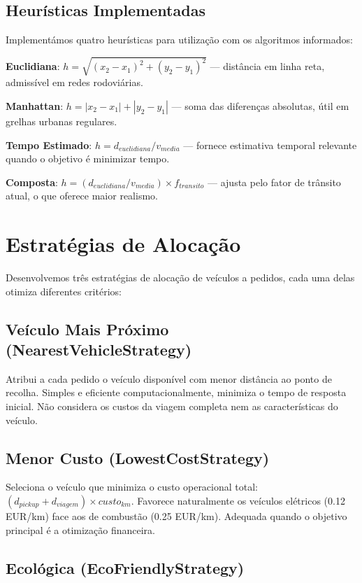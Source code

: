 \documentclass[11pt,a4paper]{article}
\begin{document}
\subsection{Heurísticas Implementadas}

Implementámos quatro heurísticas para utilização com os algoritmos informados:

\textbf{Euclidiana}: $h = \sqrt{(x_2-x_1)^2 + (y_2-y_1)^2}$ --- distância em linha reta, admissível em redes rodoviárias.

\textbf{Manhattan}: $h = |x_2-x_1| + |y_2-y_1|$ --- soma das diferenças absolutas, útil em grelhas urbanas regulares.

\textbf{Tempo Estimado}: $h = d_{euclidiana}/v_{media}$ --- fornece estimativa temporal relevante quando o objetivo é minimizar tempo.

\textbf{Composta}: $h = (d_{euclidiana}/v_{media}) \times f_{transito}$ --- ajusta pelo fator de trânsito atual, o que oferece maior realismo.

\section{Estratégias de Alocação}

Desenvolvemos três estratégias de alocação de veículos a pedidos, cada uma delas otimiza diferentes critérios:

\subsection{Veículo Mais Próximo (NearestVehicleStrategy)}

Atribui a cada pedido o veículo disponível com menor distância ao ponto de recolha. Simples e eficiente computacionalmente, minimiza o tempo de resposta inicial. Não considera os custos da viagem completa nem as características do veículo.

\subsection{Menor Custo (LowestCostStrategy)}

Seleciona o veículo que minimiza o custo operacional total: $(d_{pickup} + d_{viagem}) \times custo_{km}$. Favorece naturalmente os veículos elétricos (0.12 EUR/km) face aos de combustão (0.25 EUR/km). Adequada quando o objetivo principal é a otimização financeira.

\subsection{Ecológica (EcoFriendlyStrategy)}
\end{document}
